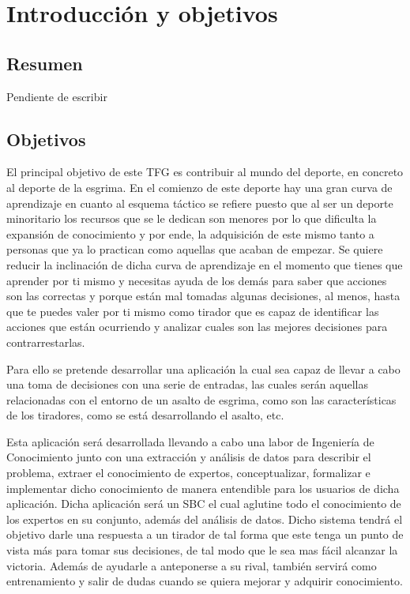 \chapter{Introducción y objetivos}
\label{cap: Introducción y objetivos}


\section{Resumen}
Pendiente de escribir

\section{Objetivos}

El principal objetivo de este TFG es contribuir al mundo del deporte, en concreto al
 deporte de la esgrima. En el comienzo de este deporte hay una gran curva de aprendizaje
 en cuanto al esquema táctico se refiere puesto que al ser un deporte minoritario los
 recursos que se le dedican son menores por lo que dificulta la expansión de conocimiento
 y por ende, la adquisición de este mismo tanto a personas que ya lo practican como aquellas
 que acaban de empezar. Se quiere reducir la inclinación de dicha curva de aprendizaje
 en el momento que tienes que aprender por ti mismo y necesitas ayuda de los demás
 para saber que acciones son las correctas y porque están mal tomadas algunas decisiones,
 al menos, hasta que te puedes valer por ti mismo como tirador que es capaz de identificar
 las acciones que están ocurriendo y analizar cuales son las mejores decisiones para contrarrestarlas.

Para ello se pretende desarrollar una aplicación la cual sea capaz de llevar a
 cabo una toma de decisiones con una serie de entradas, las cuales serán aquellas
 relacionadas con el entorno de un asalto de esgrima, como son las características
 de los tiradores, como se está desarrollando el asalto, etc.

Esta aplicación será desarrollada llevando a cabo una labor de Ingeniería de Conocimiento
 junto con una extracción y análisis de datos para describir el problema, extraer
 el conocimiento de expertos, conceptualizar, formalizar e implementar dicho conocimiento
 de manera entendible para los usuarios de dicha aplicación. Dicha aplicación será un SBC
 el cual aglutine todo el conocimiento de los expertos en su conjunto, además del análisis
 de datos. Dicho sistema tendrá el objetivo darle una respuesta a un tirador de tal forma
 que este tenga un punto de vista más para tomar sus decisiones, de tal modo que le sea mas
 fácil alcanzar la victoria. Además de ayudarle a anteponerse a su rival, también servirá
 como entrenamiento y salir de dudas cuando se quiera mejorar y adquirir conocimiento.

